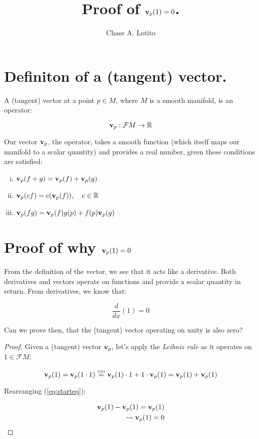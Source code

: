 \documentclass{article}
\title{Proof of \(\vb v_p(1) = 0\).}
\author{Chase A. Lotito}
\begin{document}
\maketitle{}

\section{Definiton of a (tangent) vector.}

A (tangent) vector at a point \(p \in M\), where \(M\) is a smooth manifold, is an operator:

\begin{equation*}
    \vb v_p : \mathcal{F}M \to \mathbb{R}
\end{equation*}

\noindent
Our vector \(\vb v_p\), the operator, takes a smooth function (which itself maps our manifold to a scalar quantity) and provides a real number, given these conditions are satisfied:

\begin{enumerate}[i.]
    \item \( \vb v_p (f + g) = \vb v_p(f) + \vb v_p(g) \)
    \item \( \vb v_p (cf) = c (\vb v_p(f)), ~~~ c \in \mathbb{R} \)
    \item \( \vb v_p(fg) = \vb v_p(f)g(p) + f(p)\vb v_p(g) \)
\end{enumerate}

\section{Proof of why \(\vb v_p(1) = 0\)}

From the definition of the vector, we see that it acts like a derivative. Both derivatives and vectors operate on functions and provide a scalar quantity in return. From derivatives, we know that:

\begin{equation*}
    \frac{d}{dx}(1) = 0
    \label{eq:derivative-of-one}
\end{equation*}

\noindent
Can we prove then, that the (tangent) vector operating on unity is also zero?

\begin{proof}[Proof]

    Given a (tangent) vector \(\vb v_p\), let's apply the \textit{Leibniz rule} as it operates on \(1 \in \mathcal{F}M\):

\begin{equation}
    \vb v_p(1) = \vb v_p(1 \cdot 1) \overset{\text{\tiny{(iii)}}}{=} \vb v_p(1) \cdot 1 + 1 \cdot \vb v_p(1) = \vb v_p(1) + \vb v_p(1)
    \label{eq:starteq}
\end{equation}

\noindent
Rearranging (\ref{eq:starteq}):

\begin{align*}
    \vb v_p(1) - \vb v_p(1) = \vb v_p(1) \\
    \leadsto \vb v_p(1) = 0
\end{align*}

\end{proof}
\end{document}
